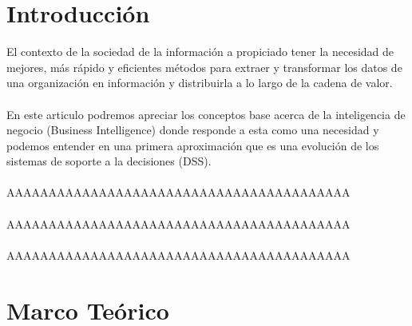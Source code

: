 \documentclass[preprint,12pt]{elsarticle}
\begin{document}
\section{Introducción}
El contexto de la sociedad de la información a propiciado tener la necesidad de mejores, más rápido y eficientes 
métodos para extraer y transformar los datos de una organización en información y distribuirla a lo largo de la 
cadena de valor.
\\
\\
En este articulo podremos apreciar los conceptos base acerca de la inteligencia de negocio (Business Intelligence)
 donde responde a esta como una necesidad y podemos entender en una primera aproximación que es una 
evolución de los sistemas de soporte a la decisiones (DSS).
\\
\\
AAAAAAAAAAAAAAAAAAAAAAAAAAAAAAAAAAAAAAAAA %
\\
\\
AAAAAAAAAAAAAAAAAAAAAAAAAAAAAAAAAAAAAAAAA %
\\
\\
AAAAAAAAAAAAAAAAAAAAAAAAAAAAAAAAAAAAAAAAA %



\section{Marco Teórico}

\end{document}
